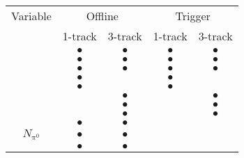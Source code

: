 \begin{tabular}{c|cc|cc}
  Variable & \multicolumn{2}{c|}{Offline}      & \multicolumn{2}{c|}{Trigger} \\
                       &  1-track  & 3-track   & 1-track   & 3-track   \\ 
  \hline
  \centEnergyFrac{}    & $\bullet$ & $\bullet$ & $\bullet$ & $\bullet$ \\
  \leadTrackMomFrac{}  & $\bullet$ & $\bullet$ & $\bullet$ & $\bullet$ \\
  \trkAvgDist{}        & $\bullet$ & $\bullet$ & $\bullet$ & $\bullet$ \\
  \ipSigLeadTrk{}      & $\bullet$ &           & $\bullet$ &           \\
  \numIsoTrack{}       & $\bullet$ &           & $\bullet$ &           \\
  \dRmax{}             &           & $\bullet$ &           & $\bullet$ \\
  \trkFlightPathSig{}  &           & $\bullet$ &           & $\bullet$ \\
  \massTrkSys{}        &           & $\bullet$ &           & $\bullet$ \\
  \massTrkPizeroSys{}  & $\bullet$ & $\bullet$ &           &           \\
  $N_{\mathrm{\pi^0}}$ & $\bullet$ & $\bullet$ &           &           \\
  \Etratio{}           & $\bullet$ & $\bullet$ &           &           \\
\end{tabular}

